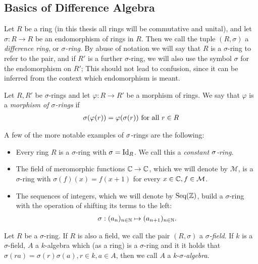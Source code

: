 \subsection{Basics of Difference Algebra}\label{fundamentos}
\begin{defn}
Let  $R$ be a ring (in this thesis all rings will be commutative and unital), and let
 $\sigma: R \rightarrow R$ be an endomorphism of rings in $R$. Then we call the tuple $(R,\sigma)$ a \emph{difference ring}, or $\sigma$\emph{-ring}. 
By abuse of notation we will say that $R$ is a $\sigma$-ring  to refer to the pair, and if $R'$ is a further $\sigma$-ring, we will also use the symbol $\sigma$ for the endomorphism on $R'$; This should not lead to confusion, since it can be inferred from the context which endomorphism is meant. 
\end{defn}

\begin{defn}
Let $R, R'$ be  $\sigma$-rings and let $\varphi: R \rightarrow R'$ be a morphism of rings. We say that $\varphi$ is a \emph{morphism of $\sigma$-rings}  if 
\begin{align*}
\sigma(\varphi(r)) = \varphi(\sigma(r)) \text{ for all } r \in R
\end{align*}
\end{defn}

\begin{ex} A few of the more notable examples of $\sigma$-rings are the following:

\begin{itemize}
\item Every ring $R$ is a $\sigma$-ring with $\sigma = \text{Id}_R$. We call this a \emph{constant $\sigma$-ring}.  
\item The field of meromorphic functions $\mathbb{C} \rightarrow \mathbb{C}$, which we will denote by $\mathcal{M}$,
is a $\sigma$-ring with $\sigma(f)(x) = f(x+1)$ for every $x \in \mathbb{C}, f \in \mathcal{M}$.
\item The sequences of integers, which we will denote by $\text{Seq}(\mathbb{Z})$, build a $\sigma$-ring with the operation of shifting its terms to the left:
\begin{align*} \sigma: (a_n)_{n \in \mathbb{N}} \mapsto (a_{n+1})_{n \in \mathbb{N}}. \end{align*}
\end{itemize}
\end{ex}

\begin{defn}
Let $R$ be a $\sigma$-ring. If $R$ is also a field, we call the pair $(R,\sigma)$ a $\sigma$\emph{-field}.  
If $k$ is a $\sigma$-field, $A$ a $k$-algebra which (as a ring) is a $\sigma$-ring and it it holds that 
$\sigma(ra) = \sigma(r) \sigma(a), r \in k, a \in A$, then we call $A$ a  $k$-$\sigma$\emph{-algebra}. 
\end{defn}

